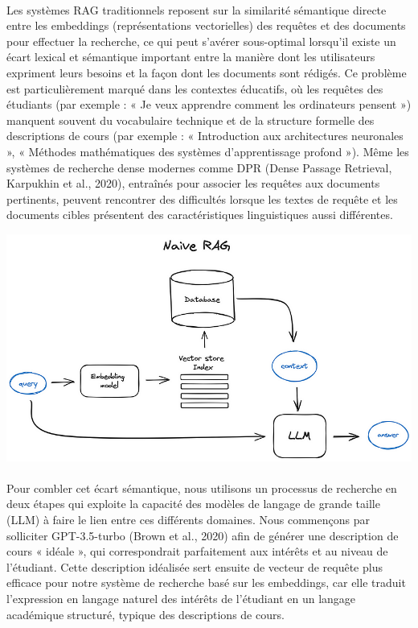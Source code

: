 \paragraph{} 
Les systèmes RAG traditionnels reposent sur la similarité sémantique directe entre les embeddings (représentations vectorielles) des requêtes et des documents pour effectuer la recherche, ce qui peut s’avérer sous-optimal lorsqu’il existe un écart lexical et sémantique important entre la manière dont les utilisateurs expriment leurs besoins et la façon dont les documents sont rédigés. Ce problème est particulièrement marqué dans les contextes éducatifs, où les requêtes des étudiants (par exemple : « Je veux apprendre comment les ordinateurs pensent ») manquent souvent du vocabulaire technique et de la structure formelle des descriptions de cours (par exemple : « Introduction aux architectures neuronales », « Méthodes mathématiques des systèmes d’apprentissage profond »). Même les systèmes de recherche dense modernes comme DPR (Dense Passage Retrieval, Karpukhin et al., 2020), entraînés pour associer les requêtes aux documents pertinents, peuvent rencontrer des difficultés lorsque les textes de requête et les documents cibles présentent des caractéristiques linguistiques aussi différentes.
\begin{minipage}{1\textwidth}
		\centering
		\includegraphics[width=\linewidth]{images/native diagrammme llm.png}
\end{minipage}
\paragraph{}
Pour combler cet écart sémantique, nous utilisons un processus de recherche en deux étapes qui exploite la capacité des modèles de langage de grande taille (LLM) à faire le lien entre ces différents domaines. Nous commençons par solliciter GPT-3.5-turbo (Brown et al., 2020) afin de générer une description de cours « idéale », qui correspondrait parfaitement aux intérêts et au niveau de l’étudiant. Cette description idéalisée sert ensuite de vecteur de requête plus efficace pour notre système de recherche basé sur les embeddings, car elle traduit l’expression en langage naturel des intérêts de l’étudiant en un langage académique structuré, typique des descriptions de cours.


